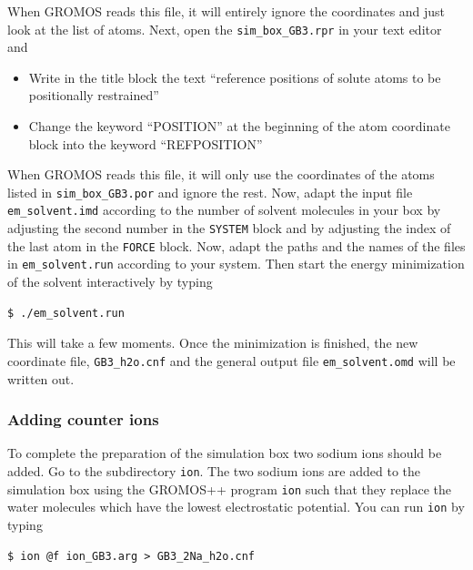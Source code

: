 When GROMOS reads this file, it will entirely ignore the coordinates and just look at the list of atoms. Next, open the \texttt{sim\_box\_GB3.rpr} in your text editor and
\begin{itemize} 
\item	Write in the title block the text “reference positions of solute atoms to be positionally restrained”
\item	Change the keyword “POSITION” at the beginning of the atom coordinate block into the keyword “REFPOSITION”
\end{itemize}
When GROMOS reads this file, it will only use the coordinates of the atoms listed in \texttt{sim\_box\_GB3.por} and ignore the rest. 
Now, adapt the input file \texttt{em\_solvent.imd} according to the number of solvent molecules in your box by adjusting the second number in the \texttt{SYSTEM} block and by adjusting the index of the last atom in the \texttt{FORCE} block.
Now, adapt the paths and the names of the files in \texttt{em\_solvent.run} according to your system. 
Then start the energy minimization of the solvent interactively by typing 
\begin{lstlisting}
$ ./em_solvent.run
\end{lstlisting}
This will take a few moments. Once the minimization is finished, the new coordinate file, \texttt{GB3\_h2o.cnf} and the general output file \texttt{em\_solvent.omd} will be written out. 

\subsubsection{Adding counter ions}

To complete the preparation of the simulation box two sodium ions should be added. Go to the subdirectory \texttt{ion}. The two sodium ions are added to the simulation box using the GROMOS++ program \texttt{ion} such that they replace the water molecules which have the lowest electrostatic potential. You can run \texttt{ion} by typing
\begin{lstlisting}
$ ion @f ion_GB3.arg > GB3_2Na_h2o.cnf
\end{lstlisting}


